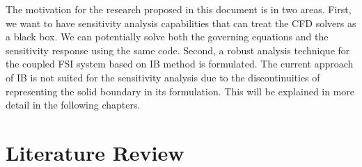 The motivation for the research proposed in this document is in two areas. First, we want to have sensitivity analysis capabilities that can treat the CFD solvers as a black box. We can potentially solve both the governing equations and the sensitivity response using the same code. Second, a robust analysis technique for the coupled FSI system based on IB method is formulated. The current approach of IB is not suited for the sensitivity analysis due to the discontinuities of representing the solid boundary in its formulation. This will be explained in more detail in the following chapters.

\section{Literature Review}
